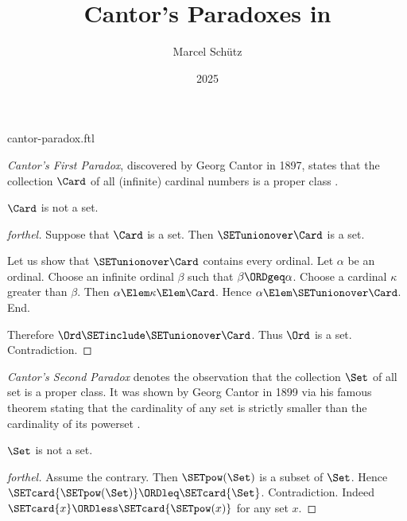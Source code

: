 \documentclass{stex}
\title{Cantor's Paradoxes in \Naproche}
\author{Marcel Schütz}
\date{2025}
\begin{document}
\begin{smodule}{cantor-paradox.ftl}
\maketitle


\noindent \emph{Cantor's First Paradox}, discovered by Georg Cantor in 1897,
states that the collection $\Card$ of all (infinite) cardinal numbers is a
proper class \cite[chapter 156]{Cantor1991}.

\begin{theorem}[forthel,title=Cantor's First Paradox,id=cantor_paradox_1]
  $\Card$ is not a set.
\end{theorem}
\begin{proof}[forthel]
  Suppose that $\Card$ is a set.
  Then $\SETunionover \Card$ is a set.

  Let us show that $\SETunionover \Card$ contains every ordinal.
    Let $\alpha$ be an ordinal.
    Choose an infinite ordinal $\beta$ such that $\beta \ORDgeq \alpha$.
    Choose a cardinal $\kappa$ greater than $\beta$.
    Then $\alpha \Elem \kappa \Elem \Card$.
    Hence $\alpha \Elem \SETunionover \Card$.
  End.

  Therefore $\Ord \SETinclude \SETunionover \Card$.
  Thus $\Ord$ is a set.
  Contradiction.
\end{proof}

\emph{Cantor's Second Paradox} denotes the observation that the collection
$\Set$ of all set is a proper class.
It was shown by Georg Cantor in 1899 via his famous theorem stating that the
cardinality of any set is strictly smaller than the cardinality of its 
powerset \cite[chapter 163]{Cantor1991}.

\begin{theorem}[forthel,title=Cantor's Second Paradox,id=cantor_paradox_2]
  $\Set$ is not a set.
\end{theorem}
\begin{proof}[forthel]
  Assume the contrary.
  Then $\SETpow(\Set)$ is a subset of $\Set$.
  Hence $\SETcard{\SETpow(\Set)} \ORDleq \SETcard{\Set}$.
  Contradiction.
  Indeed $\SETcard{x} \ORDless \SETcard{\SETpow(x)}$ for any set $x$.
\end{proof}

\printbibliography
{}
\end{smodule}
\end{document}
